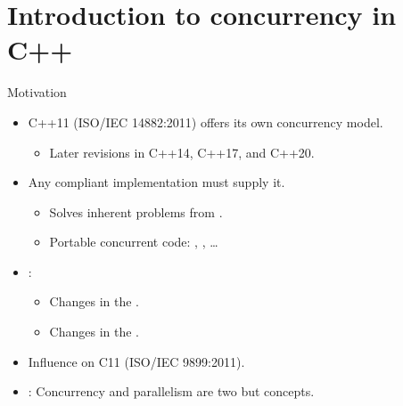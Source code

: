 \section{Introduction to concurrency in C++}

\begin{frame}{Motivation}
\begin{itemize}
  \item C++11 (ISO/IEC 14882:2011) offers its own concurrency model.
    \begin{itemize}
      \item Later revisions in C++14, C++17, and C++20.
    \end{itemize}

  \item Any compliant implementation must supply it.
    \begin{itemize}
      \item Solves inherent problems from .
      \item Portable concurrent code: , , \ldots
    \end{itemize}

  \item {}:
    \begin{itemize}
      \item Changes in the .
      \item Changes in the .
    \end{itemize}

  \item Influence on C11 (ISO/IEC 9899:2011).

  \item {}: Concurrency and parallelism are two
         but  concepts.
\end{itemize}
\end{frame}

